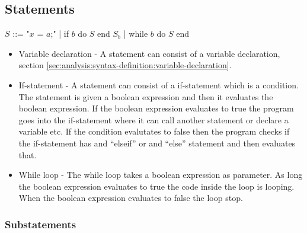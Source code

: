 \subsection{Statements}

$S$ ::= "$x$ = $a$;" | if $b$ do $S$ end $S_b$ | while $b$ do $S$ end

\begin{itemize}
	\item Variable declaration - A statement can consist of a variable declaration, section \ref{sec:analysis:syntax-definition:variable-declaration}.
	\item If-statement - A statement can consist of a if-statement which is a condition. The statement is given a boolean expression and then it evaluates the boolean expression. If the boolean expression evaluates to true the program goes into the if-statement where it can call another statement or declare a variable etc. If the condition evalutates to false then the program checks if the if-statement has and ``elseif'' or and ``else'' statement and then evaluates that.
	\item While loop - The while loop takes a boolean expression as parameter. As long the boolean expression evaluates to true the code inside the loop is looping. When the boolean expression evaluates to false the loop stop.
\end{itemize}

\subsubsection{Substatements}

